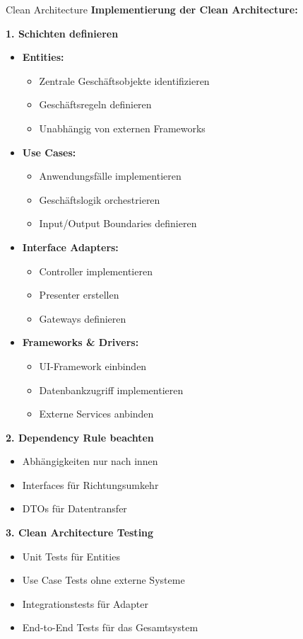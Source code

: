 \begin{KR}{Clean Architecture}
\textbf{Implementierung der Clean Architecture:}

\textbf{1. Schichten definieren}
\begin{itemize}
    \item \textbf{Entities:}
    \begin{itemize}
        \item Zentrale Geschäftsobjekte identifizieren
        \item Geschäftsregeln definieren
        \item Unabhängig von externen Frameworks
    \end{itemize}
    
    \item \textbf{Use Cases:}
    \begin{itemize}
        \item Anwendungsfälle implementieren
        \item Geschäftslogik orchestrieren
        \item Input/Output Boundaries definieren
    \end{itemize}
    
    \item \textbf{Interface Adapters:}
    \begin{itemize}
        \item Controller implementieren
        \item Presenter erstellen
        \item Gateways definieren
    \end{itemize}
    
    \item \textbf{Frameworks \& Drivers:}
    \begin{itemize}
        \item UI-Framework einbinden
        \item Datenbankzugriff implementieren
        \item Externe Services anbinden
    \end{itemize}
\end{itemize}

\textbf{2. Dependency Rule beachten}
\begin{itemize}
    \item Abhängigkeiten nur nach innen
    \item Interfaces für Richtungsumkehr
    \item DTOs für Datentransfer
\end{itemize}

\textbf{3. Clean Architecture Testing}
\begin{itemize}
    \item Unit Tests für Entities
    \item Use Case Tests ohne externe Systeme
    \item Integrationstests für Adapter
    \item End-to-End Tests für das Gesamtsystem
\end{itemize}
\end{KR}

